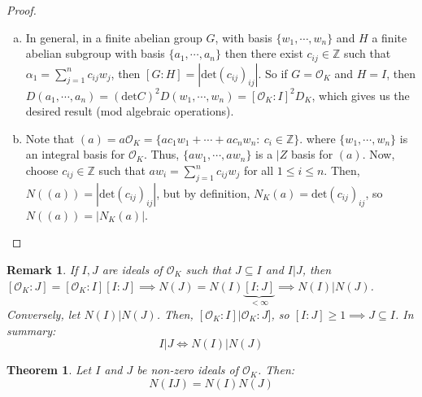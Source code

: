 \documentclass{article}
\newcommand{\air}{\mathcal{O}_K}
\newcommand{\Z}{\mathbb{Z}}
\newtheorem{theorem}{Theorem}[subsection]
\newtheorem{remark}{Remark}[subsection]
\begin{document}
\begin{proof}
\begin{enumerate}[a)]
\item In general, in a finite abelian group $G$, with basis $\{w_1,\cdots ,w_n\}$ and $H$ a finite abelian subgroup with basis $\{a_1,\cdots ,a_n\}$ then there exist $c_{ij}\in\Z$ such that $\alpha_1=\displaystyle\sum_{j=1}^nc_{ij}w_j$, then $[G:H]=|\text{det}(c_{ij})_{ij}|$. So if $G=\air$ and $H=I$, then $D(a_1,\cdots, a_n)=(\text{det} C)^2 D(w_1, \cdots, w_n)=[\air:I]^2D_K$, which gives us the desired result (mod algebraic operations).
\item Note that $(a)=a\air = \{ac_1w_1+\cdots +ac_nw_n:\ c_i\in\Z\}$. where $\{w_1,\cdots, w_n\}$ is an integral basis for $\air$. Thus, $\{aw_1, \cdots, aw_n\}$ is a $|Z$ basis for $(a)$. Now, choose $c_{ij}\in\Z$ such that $aw_i=\displaystyle\sum_{j=1}^nc_{ij}w_j$ for all $1\leq i\leq n$. Then, $N((a))=|\text{det}(c_{ij})_{ij}|$, but by definition, $N_K(a)=\text{det}(c_{ij})_{ij}$, so $N((a))=|N_K(a)|$.
\end{enumerate}
\end{proof}
\begin{remark}
If $I,J$ are ideals of $\air$ such that $J\subseteq I$ and $I|J$, then $[\air:J]=[\air :I][I:J]\implies N(J)=N(I)\underbrace{[I:J]}_{<\infty}\implies N(I)|N(J)$. Conversely, let $N(I)|N(J)$. Then, $[\air:I]|\air: J]$, so $[I:J]\geq 1\implies J\subseteq I$. In summary:
$$I|J\iff N(I)|N(J)$$
\end{remark}
\begin{theorem}
Let $I$ and $J$ be non-zero ideals of $\air$. Then:
$$N(IJ)=N(I)N(J)$$
\end{theorem}
\end{document}
